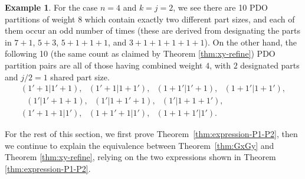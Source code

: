 \documentclass[11pt,reqno]{amsart}
\numberwithin{equation}{section}
\theoremstyle{plain}
\theoremstyle{definition}
\newtheorem{example}[theorem]{Example}
\theoremstyle{named}
\begin{document}
\begin{example}
For the case $n=4$ and $k=j=2$, we see there are 10 PDO partitions of weight $8$ which contain exactly two different part sizes, and each of them occur an odd number of times (these are derived from designating the parts in $7+1$, $5+3$, $5+1+1+1$, and $3+1+1+1+1+1$). On the other hand, the following 10 (the same count as claimed by Theorem \ref{thm:xy-refine}) PDO partition pairs are all of those having combined weight $4$, with $2$ designated parts and $j/2=1$ shared part size.
\begin{gather*}
(1'+1 | 1'+1), \ \ \  (1'+1 | 1+1'),\ \ \ (1+1' | 1'+1), \ \ \  (1+1' | 1+1'),\\
 \ \ \ (1' | 1'+1+1 ), \ \ \ (1' | 1+1'+1 ), \ \ \ (1' | 1+1+1' ), \\
 (1'+1+1 | 1'), \ \ \ (1+1'+1 | 1'), \ \ \ (1+1+1' | 1'). 
\end{gather*}
\end{example}

For the rest of this section, we first prove Theorem~\ref{thm:expression-P1-P2}, then we continue to explain the equivalence between Theorem~\ref{thm:GxGy} and Theorem \ref{thm:xy-refine}, relying on the two expressions shown in Theorem \ref{thm:expression-P1-P2}. 
\end{document}
